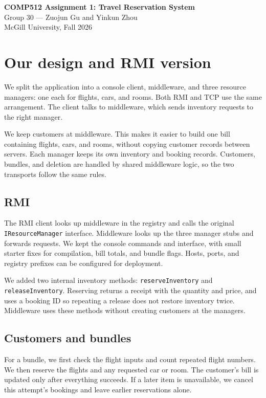 \documentclass[11pt,letterpaper]{article}
\newcommand{\code}[1]{\texttt{#1}}
\begin{document}
\begin{center}
{\Large\bfseries COMP512 Assignment 1: Travel Reservation System}\\[6pt]
Group 30 --- Zuojun Gu and Yinkun Zhou\\
McGill University, Fall 2026
\end{center}

\section{Our design and RMI version}
We split the application into a console client, middleware, and three resource managers:
one each for flights, cars, and rooms. Both RMI and TCP use the same arrangement.
The client talks to middleware, which sends inventory requests to the right manager.

We keep customers at middleware. This makes it easier to build one bill containing
flights, cars, and rooms, without copying customer records between servers. Each manager
keeps its own inventory and booking records. Customers, bundles, and deletion are handled
by shared middleware logic, so the two transports follow the same rules.

\subsection{RMI}
The RMI client looks up middleware in the registry and calls the original
\code{IResourceManager} interface. Middleware looks up the three manager stubs and
forwards requests. We kept the console commands and interface, with small starter fixes
for compilation, bill totals, and bundle flags. Hosts, ports, and registry prefixes
can be configured for deployment.

We added two internal inventory methods: \code{reserveInventory} and
\code{releaseInventory}. Reserving returns a receipt with the quantity and price, and
uses a booking ID so repeating a release does not restore inventory twice.
Middleware uses these methods without creating customers at the managers.

\subsection{Customers and bundles}
For a bundle, we first check the flight inputs and count repeated flight numbers.
We then reserve the flights and any requested car or room. The customer's bill is
updated only after everything succeeds. If a later item is unavailable, we cancel
this attempt's bookings and leave earlier reservations alone.
\end{document}
